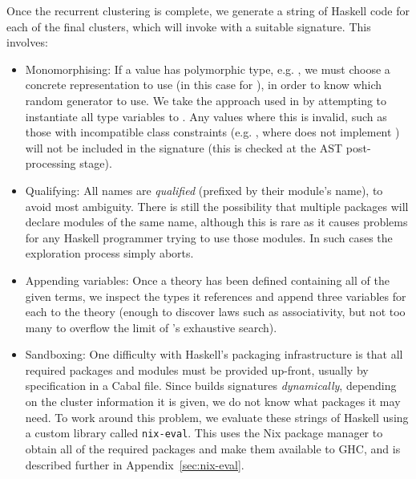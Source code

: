 Once the recurrent clustering is complete, we generate a string of Haskell code
for each of the final clusters, which will invoke \quickspec{} with a suitable
signature. This involves:

\begin{itemize}
\item{Monomorphising}: If a value has polymorphic type, e.g. , we must choose a concrete representation to use (in this
  case for ), in order to know which random generator to use. We take the
  approach used in \quickcheck{} by attempting to instantiate all type variables to
  . Any values where this is invalid, such as those with
  incompatible class constraints (e.g. , where
   does not implement ) will not be included in the
  signature (this is checked at the AST post-processing stage).

\item{Qualifying}: All names are \emph{qualified} (prefixed by their module's
  name), to avoid most ambiguity. There is still the possibility that multiple
  packages will declare modules of the same name, although this is rare as it
  causes problems for any Haskell programmer trying to use those modules. In
  such cases the exploration process simply aborts.

\item{Appending variables}: Once a \quickspec{} theory has been defined containing
  all of the given terms, we inspect the types it references and append three
  variables for each to the theory (enough to discover laws such as
  associativity, but not too many to overflow the limit of \quickspec{}'s exhaustive
  search).

\item{Sandboxing}: One difficulty with Haskell's packaging infrastructure is
  that all required packages and modules must be provided up-front, usually by
  specification in a Cabal file. Since \mlspec{} builds signatures
  \emph{dynamically}, depending on the cluster information it is given, we do
  not know what packages it may need. To work around this problem, we evaluate
  these strings of Haskell using a custom library called \texttt{nix-eval}. This
  uses the Nix package manager to obtain all of the required packages and make
  them available to GHC, and is described further in
  Appendix~\ref{sec:nix-eval}.

\end{itemize}

